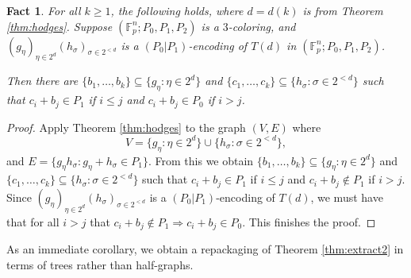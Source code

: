 \documentclass[12pt,oneside,british,a4wide]{amsart}
\newtheorem{fact}[theorem]{Fact}
\numberwithin{equation}{section}
\theoremstyle{definition}
\def\F{\mathbb{F}}
\begin{document}
\begin{fact}\label{thm:hodges1}
For all $k\geq 1$,  the following holds, where $d=d(k)$ is from Theorem \ref{thm:hodges}.  Suppose $(\F_p^n;P_0,P_1,P_2)$ is a $3$-coloring, and $(g_{\eta})_{\eta\in 2^d}(h_{\sigma})_{\sigma\in 2^{<d}}$ is a $(P_0|P_1)$-encoding of $T(d)$ in $(\F_p^n;P_0,P_1,P_2)$.  

Then there are $\{b_1,\ldots, b_k\}\subseteq \{g_{\eta}: \eta\in 2^d\}$ and $\{c_1,\ldots, c_k\}\subseteq \{h_{\sigma}: \sigma\in 2^{<d}\}$ such that $c_i+b_j\in P_1$ if  $i\leq j$ and $c_i+b_j\in P_0$ if $i>j$.
\end{fact}
\begin{proof}
Apply Theorem \ref{thm:hodges} to the graph $(V,E)$ where 
$$
V=\{g_{\eta}: \eta\in 2^d\}\cup \{h_{\sigma}: \sigma\in 2^{<d}\},
$$
 and $E=\{g_{\eta}h_{\sigma}: g_{\eta}+h_{\sigma}\in P_1\}$.  From this we obtain $\{b_1,\ldots, b_k\}\subseteq \{g_{\eta}: \eta\in 2^d\}$ and $\{c_1,\ldots, c_k\}\subseteq \{h_{\sigma}: \sigma\in 2^{<d}\}$ such that $c_i+b_j\in P_1$ if  $i\leq j$ and $c_i+b_j\notin P_1$ if $i>j$.  Since  $(g_{\eta})_{\eta\in 2^d}(h_{\sigma})_{\sigma\in 2^{<d}}$ is a $(P_0|P_1)$-encoding of $T(d)$, we must have that for all $i>j$ that $c_i+b_j\notin P_1 \Rightarrow c_i+b_j\in P_0$.  This finishes the proof.
\end{proof}


As an immediate corollary, we obtain a repackaging of Theorem \ref{thm:extract2} in terms of trees rather than half-graphs.  
\end{document}
